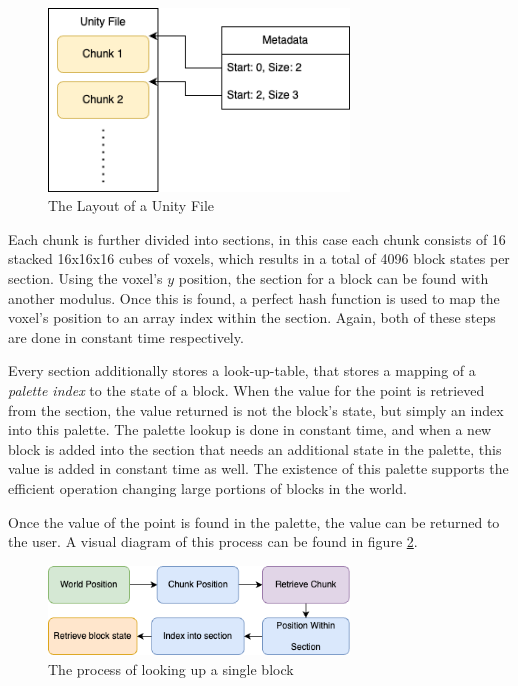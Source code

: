 \documentclass[10pt,twocolumn]{article}
\begin{document}
\begin{figure}
  \centering
  \includegraphics[width=8cm]{unity-file.drawio.png}
  \caption{The Layout of a Unity File}
  \label{fig:unity}
\end{figure}

Each chunk is further divided into sections, in this case each chunk consists of
16 stacked 16x16x16 cubes of voxels, which results in a total of 4096 block
states per section. Using the voxel's $y$ position, the section for a block can
be found with another modulus. Once this is found, a perfect hash function is
used to map the voxel's position to an array index within the section. Again,
both of these steps are done in constant time respectively.

Every section additionally stores a look-up-table, that stores a mapping of a
\textit{palette index} to the state of a block. When the value for the point is
retrieved from the section, the value returned is not the block's state, but
simply an index into this palette. The palette lookup is done in constant time,
and when a new block is added into the section that needs an additional state in
the palette, this value is added in constant time as well. The existence of this
palette supports the efficient operation changing large portions of blocks in
the world.

Once the value of the point is found in the palette, the value can be returned
to the user. A visual diagram of this process can be found in figure
\ref{fig:lookup}.

\begin{figure}
  \centering
  \includegraphics[width=8cm]{block-search.drawio.png}
  \caption{The process of looking up a single block}
  \label{fig:lookup}
\end{figure}
\end{document}
